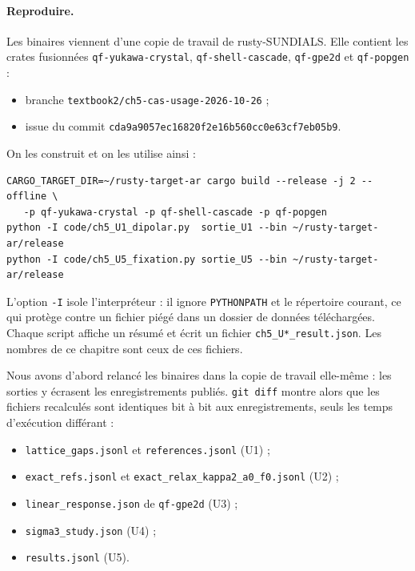 \paragraph{Reproduire.} Les binaires viennent d'une copie de travail de rusty-SUNDIALS. Elle contient les crates
fusionnées \texttt{qf-yukawa-crystal}, \texttt{qf-shell-cascade}, \texttt{qf-gpe2d} et \texttt{qf-popgen} :
\begin{itemize}
\item branche \texttt{textbook2/ch5-cas-usage-2026-10-26} ;
\item issue du commit \texttt{cda9a9057ec16820f2e16b560cc0e63cf7eb05b9}.
\end{itemize}
On les construit et on les utilise ainsi :
\begin{lstlisting}[language={}]
CARGO_TARGET_DIR=~/rusty-target-ar cargo build --release -j 2 --offline \
   -p qf-yukawa-crystal -p qf-shell-cascade -p qf-popgen
python -I code/ch5_U1_dipolar.py  sortie_U1 --bin ~/rusty-target-ar/release
python -I code/ch5_U5_fixation.py sortie_U5 --bin ~/rusty-target-ar/release
\end{lstlisting}
L'option \texttt{-I} isole l'interpréteur : il ignore \texttt{PYTHONPATH} et le répertoire courant, ce qui protège
contre un fichier piégé dans un dossier de données téléchargées. Chaque script affiche un résumé et écrit un fichier
\texttt{ch5\_U*\_result.json}. Les nombres de ce chapitre sont ceux de ces fichiers.

Nous avons d'abord relancé les binaires dans la copie de travail elle-même : les sorties y écrasent les
enregistrements publiés. \texttt{git diff} montre alors que les fichiers recalculés sont identiques bit à bit
aux enregistrements, seuls les temps d'exécution différant :
\begin{itemize}
\item \texttt{lattice\_gaps.jsonl} et \texttt{references.jsonl} (U1) ;
\item \texttt{exact\_refs.jsonl} et \texttt{exact\_relax\_kappa2\_a0\_f0.jsonl} (U2) ;
\item \texttt{linear\_response.json} de \texttt{qf-gpe2d} (U3) ;
\item \texttt{sigma3\_study.json} (U4) ;
\item \texttt{results.jsonl} (U5).
\end{itemize}

